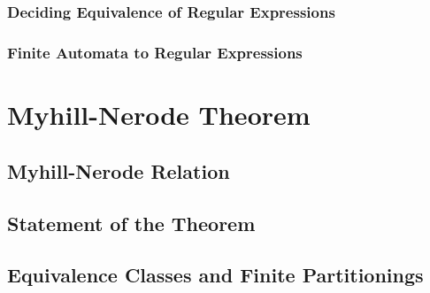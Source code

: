 \documentclass[11pt,a4paper,oneside]{book}
\begin{document}
            \subsection{Deciding Equivalence of Regular Expressions}

                \paragraph{}

            \subsection{Finite Automata to Regular Expressions}

                \paragraph{}

            \paragraph{} 


            

        \chapter{Myhill-Nerode Theorem}

            \section{Myhill-Nerode Relation}

                \paragraph{}
        
            \section{Statement of the Theorem}

                \paragraph{}

            \section{Equivalence Classes and Finite Partitionings}
\end{document}
